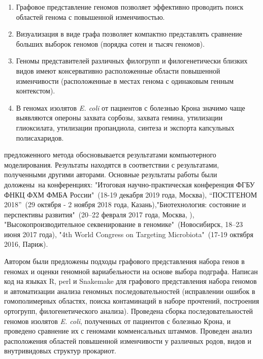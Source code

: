 {}
\begin{enumerate}[beginpenalty=10000] %
	
    \item Графовое представление геномов позволяет эффективно проводить поиск областей генома с повышенной изменчивостью.

	\item Визуализация в виде графа позволяет компактно представлять сравнение больших выборок геномов (порядка сотен и тысяч геномов).

 	\item Геномы представителей различных филогрупп и филогенетически близких видов имеют консервативно расположенные области повышенной изменчивости (расположенные в местах генома с одинаковым генным контекстом).
 	
     \item В геномах изолятов \textit{E. coli} от пациентов с болезнью Крона значимо чаще выявляются опероны захвата сорбозы, захвата гемина, утилизации глиоксилата, утилизации пропандиола, синтеза и экспорта капсульных полисахаридов.

\end{enumerate}


{\reliability} предложенного метода обосновывается результатами компьютерного моделирования. Результаты находятся в соответствии с результатами, полученными другими авторами. Основные результаты работы были доложены~на конференциях: "Итоговая научно-практическая конференция ФГБУ ФНКЦ ФХМ ФМБА России"\ (18-19 декабря 2019 года, Москва), “ПОСТГЕНОМ 2018”\ (29 октября - 2 ноября 2018 года, Казань),"Биотехнология: состояние и перспективы развития"\ (20–22 февраля 2017 года, Москва, ), "Высокопроизводительное секвенирование в геномике"\ (Новосибирск, 18–23 июня 2017 года), "4th World Congress on Targeting Microbiota"\ (17-19 октября 2016, Париж).


{\contribution} 
Автором были предложены подходы графового представления набора генов в геномах и оценки геномной вариабельности на основе выбора подграфа. Написан код на языках R, perl и Snakemake для графового представления набора геномов и автоматизации анализа геномных последовательностей (исправлении ошибок в гомополимерных областях, поиска контаминаций в наборе прочтений, построения ортогрупп, филогенетического анализа). Проведена сборка последовательностей геномов изолятов \textit{E. coli}, полученных от пациентов с болезнью Крона, и проведено сравнение их с геномами комменсальных штаммов. Проведен анализ расположения областей повышенной изменчивости у различных родов, видов и внутривидовых структур прокариот.

